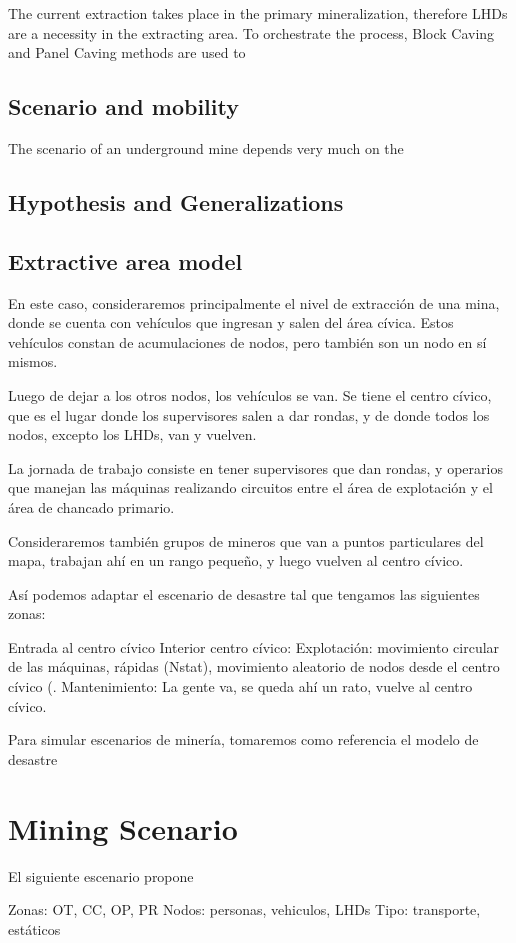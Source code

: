 The current extraction takes place in the primary mineralization, therefore LHDs are a necessity in the extracting area. To orchestrate the process, Block Caving and Panel Caving methods are used to 



\subsection{Scenario and mobility}

The scenario of an underground mine depends very much on the 

\subsection{Hypothesis and Generalizations}

\subsection{Extractive area model}





En este caso, consideraremos principalmente el nivel de extracción de una mina, donde se cuenta con vehículos que ingresan y salen del área cívica. Estos vehículos constan de acumulaciones de nodos, pero también son un nodo en sí mismos.

Luego de dejar a los otros nodos, los vehículos se van. Se tiene el centro cívico, que es el lugar donde los supervisores salen a dar rondas, y de donde todos los nodos, excepto los LHDs, van y vuelven.

La jornada de trabajo consiste en tener supervisores que dan rondas, y operarios que manejan las máquinas realizando circuitos entre el área de explotación y el área de chancado primario.

Consideraremos también grupos de mineros que van a puntos particulares del mapa, trabajan ahí en un rango pequeño, y luego vuelven al centro cívico.

Así podemos adaptar el escenario de desastre tal que tengamos las siguientes zonas:

Entrada al centro cívico
Interior centro cívico: 
Explotación: movimiento circular de las máquinas, rápidas (Nstat), movimiento aleatorio de nodos desde el centro cívico (.
Mantenimiento: La gente va, se queda ahí un rato, vuelve al centro cívico.

Para simular escenarios de minería, tomaremos como referencia el modelo de desastre 


\section*{Mining Scenario}

El siguiente escenario propone 

Zonas: OT, CC, OP, PR
Nodos: personas, vehiculos, LHDs
Tipo: transporte, estáticos


